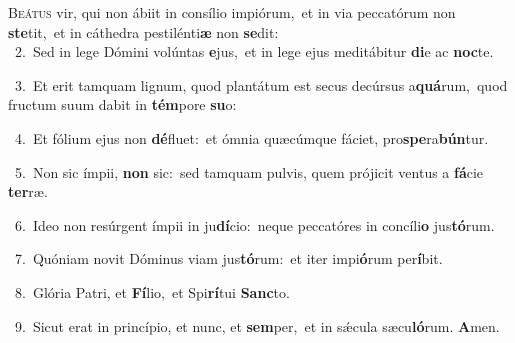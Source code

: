\lettrine{\initial\textcolor{\initialcolor}{B}}{eátus} vir, qui non ábiit in consílio impiórum,~\dagger et in via peccatórum non \textbf{ste}\-tit,~\star et in cáthedra pestilénti\textbf{æ} non \textbf{se}\-dit:\\
{\numbfont\textcolor{\numbcolor}{~2.}}~Sed in lege Dómini volúntas \textbf{e}\-jus,~\star et in lege ejus meditábitur \textbf{di}\-e ac \textbf{noc}\-te.\par
{\numbfont\textcolor{\numbcolor}{~3.}}~Et erit tamquam lignum, quod plantátum est secus decúrsus a\-\textbf{quá}\-rum,~\star quod fructum suum dabit in \textbf{tém}\-pore \textbf{su}\-o:\par
{\numbfont\textcolor{\numbcolor}{~4.}}~Et fólium ejus non \textbf{dé}\-fluet:~\star et ómnia quæcúmque fáciet, pro\-\textbf{spe}\-ra\-\textbf{bún}\-tur.\par
{\numbfont\textcolor{\numbcolor}{~5.}}~Non sic ímpii, \textbf{non} sic:~\star sed tamquam pulvis, quem prójicit ventus a \textbf{fá}\-cie \textbf{ter}\-ræ.\par
{\numbfont\textcolor{\numbcolor}{~6.}}~Ideo non resúrgent ímpii in ju\-\textbf{dí}\-cio:~\star neque peccatóres in concíli\textbf{o} jus\-\textbf{tó}\-rum.\par
{\numbfont\textcolor{\numbcolor}{~7.}}~Quóniam novit Dóminus viam jus\-\textbf{tó}\-rum:~\star et iter impi\-\textbf{ó}\-rum per\-\textbf{í}\-bit.\par
{\numbfont\textcolor{\numbcolor}{~8.}}~Glória Patri, et \textbf{Fí}\-lio,~\star et Spi\-\textbf{rí}\-tui \textbf{Sanc}\-to.\par
{\numbfont\textcolor{\numbcolor}{~9.}}~Sicut erat in princípio, et nunc, et \textbf{sem}\-per,~\star et in sǽcula sæcu\-\textbf{ló}\-rum. \textbf{A}\-men.\par
